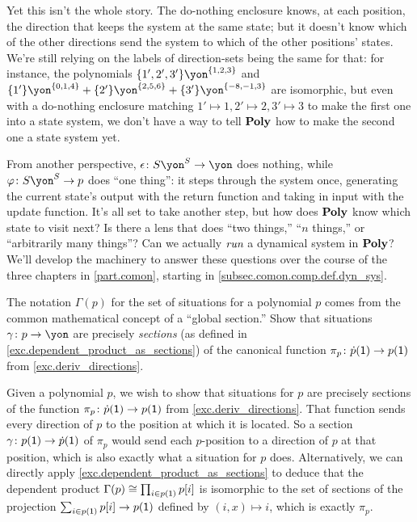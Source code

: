 \documentclass[Book-Poly]{subfiles}
\begin{document}
\begin{example}
Yet this isn't the whole story.
The do-nothing enclosure knows, at each position, the direction that keeps the system at the same state; but it doesn't know which of the other directions send the system to which of the other positions' states.
We're still relying on the labels of direction-sets being the same for that: for instance, the polynomials $\{1',2',3'\}\yon^{\{1,2,3\}}$ and $\{1'\}\yon^{\{0,1,4\}}+\{2'\}\yon^{\{2,5,6\}}+\{3'\}\yon^{\{-8,-1,3\}}$ are isomorphic, but even with a do-nothing enclosure matching $1'\mapsto1,2'\mapsto2,3'\mapsto3$ to make the first one into a state system, we don't have a way to tell $\mathbf{Poly}$ how to make the second one a state system yet.

From another perspective, $\epsilon\colon S\yon^S\to\yon$ does nothing, while $\varphi\colon S\yon^S\to p$ does ``one thing'': it steps through the system once, generating the current state's output with the return function and taking in input with the update function.
It's all set to take another step, but how does $\mathbf{Poly}$ know which state to visit next?
Is there a lens that does ``two things,'' ``$n$ things,'' or ``arbitrarily many things''?
Can we actually $\emph{run}$ a dynamical system in $\mathbf{Poly}$?
We'll develop the machinery to answer these questions over the course of the three chapters in \cref{part.comon}, starting in \cref{subsec.comon.comp.def.dyn_sys}.
\end{example}

\begin{exercise}
The notation $\Gamma(p)$ for the set of situations for a polynomial $p$ comes from the common mathematical concept of a ``global section.''
Show that situations $\gamma\colon p\to\yon$ are precisely \emph{sections} (as defined in \cref{exc.dependent_product_as_sections}) of the canonical function $\pi_p\colon\dot{p}(\textsf{1})\to p(\textsf{1})$ from \cref{exc.deriv_directions}.
\begin{solution}
Given a polynomial $p$, we wish to show that situations for $p$ are precisely sections of the function $\pi_p\colon\dot{p}(\textsf{1})\to p(\textsf{1})$ from \cref{exc.deriv_directions}.
That function sends every direction of $p$ to the position at which it is located.
So a section $\gamma\colon p(\textsf{1})\to\dot{p}(\textsf{1})$ of $\pi_p$ would send each $p$-position to a direction of $p$ at that position, which is also exactly what a situation for $p$ does.
Alternatively, we can directly apply \cref{exc.dependent_product_as_sections} to deduce that the dependent product $\Gamma(p)\cong\prod_{i \in p(\textsf{1})}p[i]$ is isomorphic to the set of sections of the projection $\sum_{i\in p(\textsf{1})}p[i]\to p(\textsf{1})$ defined by $(i,x)\mapsto i$, which is exactly $\pi_p$.
\end{solution}
\end{exercise}
\end{document}
